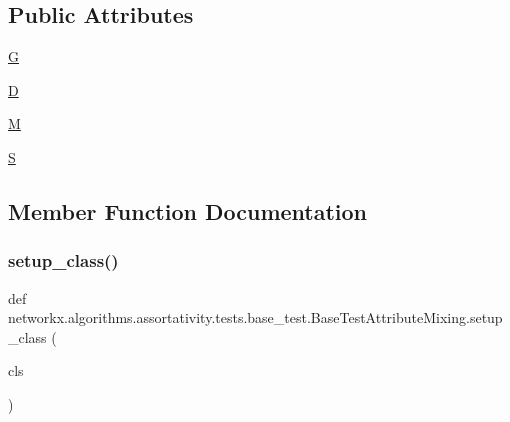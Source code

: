 \subsection*{Public Attributes}
\begin{DoxyCompactItemize}
\item 
\hyperlink{classnetworkx_1_1algorithms_1_1assortativity_1_1tests_1_1base__test_1_1BaseTestAttributeMixing_ae8c34f5b0dfece713c9db14a8cc410ff}{G}
\item 
\hyperlink{classnetworkx_1_1algorithms_1_1assortativity_1_1tests_1_1base__test_1_1BaseTestAttributeMixing_a92e7d4690567c9ce6919a87e7e85ecb1}{D}
\item 
\hyperlink{classnetworkx_1_1algorithms_1_1assortativity_1_1tests_1_1base__test_1_1BaseTestAttributeMixing_a07c8bebe4d79e8398cf5b744c6b2d47d}{M}
\item 
\hyperlink{classnetworkx_1_1algorithms_1_1assortativity_1_1tests_1_1base__test_1_1BaseTestAttributeMixing_a5081f0040b08ab9498de62fcbbf23359}{S}
\end{DoxyCompactItemize}


\subsection{Member Function Documentation}
\mbox{\label{classnetworkx_1_1algorithms_1_1assortativity_1_1tests_1_1base__test_1_1BaseTestAttributeMixing_a46bde4c60fb4f5e4f6f9059ed028b194}} 
\subsubsection{\texorpdfstring{setup\+\_\+class()}{setup\_class()}}
{\footnotesize\ttfamily def networkx.\+algorithms.\+assortativity.\+tests.\+base\+\_\+test.\+Base\+Test\+Attribute\+Mixing.\+setup\+\_\+class (\begin{DoxyParamCaption}\item[{}]{cls }\end{DoxyParamCaption})}



